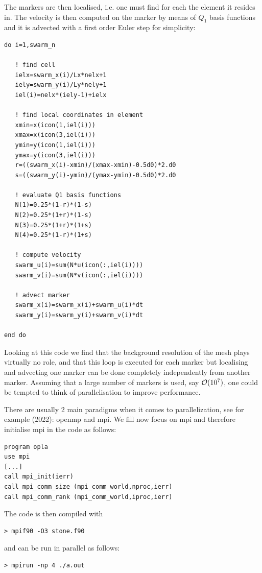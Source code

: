 The markers are then localised, i.e. one must find for each the element it resides in.
The velocity is then computed on the marker by means of $Q_1$ basis functions
and it is advected with a first order Euler step for simplicity: 
\begin{verbatim}
do i=1,swarm_n

   ! find cell
   ielx=swarm_x(i)/Lx*nelx+1
   iely=swarm_y(i)/Ly*nely+1
   iel(i)=nelx*(iely-1)+ielx

   ! find local coordinates in element
   xmin=x(icon(1,iel(i)))
   xmax=x(icon(3,iel(i)))
   ymin=y(icon(1,iel(i)))
   ymax=y(icon(3,iel(i)))
   r=((swarm_x(i)-xmin)/(xmax-xmin)-0.5d0)*2.d0
   s=((swarm_y(i)-ymin)/(ymax-ymin)-0.5d0)*2.d0

   ! evaluate Q1 basis functions
   N(1)=0.25*(1-r)*(1-s)
   N(2)=0.25*(1+r)*(1-s)
   N(3)=0.25*(1+r)*(1+s)
   N(4)=0.25*(1-r)*(1+s)

   ! compute velocity
   swarm_u(i)=sum(N*u(icon(:,iel(i))))
   swarm_v(i)=sum(N*v(icon(:,iel(i))))

   ! advect marker
   swarm_x(i)=swarm_x(i)+swarm_u(i)*dt
   swarm_y(i)=swarm_y(i)+swarm_v(i)*dt

end do
\end{verbatim}

Looking at this code we find that the background resolution of the mesh 
plays virtually no role, and that this loop is executed for each marker
but localising and advecting one marker can be done completely 
independently from another marker. 
Assuming that a large number of markers is used, say ${\cal O}(10^7)$, 
one could be tempted to think of parallelisation to improve performance. 

There are usually 2 main paradigms when it comes to parallelization,
see for example \textcite{vacp22} (2022): openmp and mpi. 
We fill now focus on mpi and therefore initialise mpi in the code as follows:
 
\begin{verbatim}
program opla
use mpi
[...]
call mpi_init(ierr)
call mpi_comm_size (mpi_comm_world,nproc,ierr)
call mpi_comm_rank (mpi_comm_world,iproc,ierr)
\end{verbatim}

The code is then compiled with 
\begin{verbatim}
> mpif90 -O3 stone.f90
\end{verbatim}
and can be run in parallel as follows:
\begin{verbatim}
> mpirun -np 4 ./a.out 
\end{verbatim}

